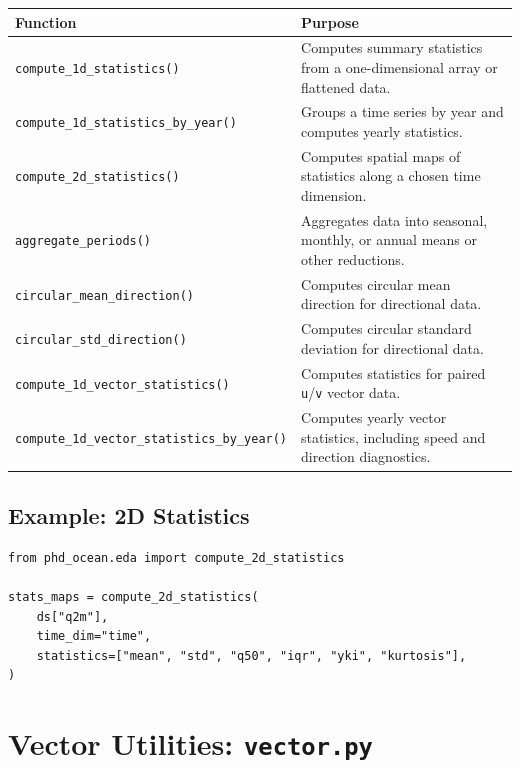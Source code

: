 \documentclass[11pt,a4paper]{article}
\begin{document}
\begin{longtable}{p{}p{}}
\toprule
\textbf{Function} & \textbf{Purpose} \\
\midrule
\endhead

\texttt{compute\_1d\_statistics()} &
Computes summary statistics from a one-dimensional array or flattened data. \\

\texttt{compute\_1d\_statistics\_by\_year()} &
Groups a time series by year and computes yearly statistics. \\

\texttt{compute\_2d\_statistics()} &
Computes spatial maps of statistics along a chosen time dimension. \\

\texttt{aggregate\_periods()} &
Aggregates data into seasonal, monthly, or annual means or other reductions. \\

\texttt{circular\_mean\_direction()} &
Computes circular mean direction for directional data. \\

\texttt{circular\_std\_direction()} &
Computes circular standard deviation for directional data. \\

\texttt{compute\_1d\_vector\_statistics()} &
Computes statistics for paired \texttt{u}/\texttt{v} vector data. \\

\texttt{compute\_1d\_vector\_statistics\_by\_year()} &
Computes yearly vector statistics, including speed and direction diagnostics. \\

\bottomrule
\end{longtable}

\subsection{Example: 2D Statistics}

\begin{lstlisting}[style=pythonstyle]
from phd_ocean.eda import compute_2d_statistics

stats_maps = compute_2d_statistics(
    ds["q2m"],
    time_dim="time",
    statistics=["mean", "std", "q50", "iqr", "yki", "kurtosis"],
)
\end{lstlisting}

\section{Vector Utilities: \texttt{vector.py}}
\end{document}
